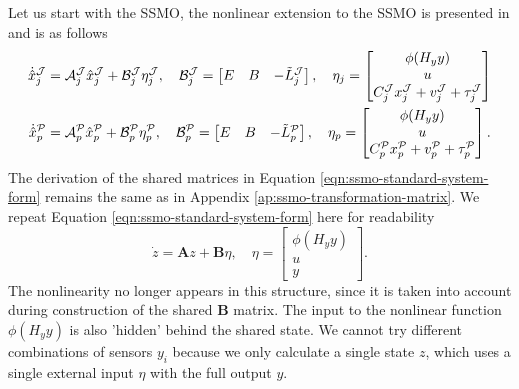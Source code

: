 Let us start with the SSMO, the nonlinear extension to the SSMO is presented in \cite{Chong2023MemoryAlgorithms} and is as follows
\begin{equation*}
    \begin{split}
        \dot{\hat{x}}_{j}^{\mathcal{J}} &= \mathcal{A}_{j}^{\mathcal{J}}\hat{x}_{j}^{\mathcal{J}} + \mathcal{B}_{j}^{\mathcal{J}}\eta_{j}^{\mathcal{J}}, \quad
        \mathcal{B}_{j}^{\mathcal{J}} =
        \begin{bmatrix}
            E & B & -\Tilde{L}_{j}^{\mathcal{J}} \\
        \end{bmatrix}, \quad \eta_j =
        \begin{bmatrix}
            \phi(H_yy) \\
            u \\
            C_{j}^{\mathcal{J}}x_{j}^{\mathcal{J}} + v_{j}^{\mathcal{J}} + \tau_{j}^{\mathcal{J}}
        \end{bmatrix} \\ 
        \dot{\hat{x}}_{p}^{\mathcal{P}} &= \mathcal{A}_{p}^{\mathcal{P}}\hat{x}_{p}^{\mathcal{P}} + \mathcal{B}_{p}^{\mathcal{P}}\eta_{p}^{\mathcal{P}}, \quad
        \mathcal{B}_{p}^{\mathcal{P}} =
        \begin{bmatrix}
            E & B & -\Tilde{L}_{p}^{\mathcal{P}} \\
        \end{bmatrix}, \quad \eta_p =
        \begin{bmatrix}
            \phi(H_yy) \\
            u \\
            C_{p}^{\mathcal{P}}x_{p}^{\mathcal{P}} + v_{p}^{\mathcal{P}} + \tau_{p}^{\mathcal{P}}
        \end{bmatrix}.
    \end{split}
\end{equation*}
The derivation of the shared matrices in Equation \eqref{eqn:ssmo-standard-system-form} remains the same as in Appendix \ref{ap:ssmo-transformation-matrix}. We repeat Equation \eqref{eqn:ssmo-standard-system-form} here for readability
\begin{equation*}
    \dot{z} = \mathbf{A}z + \mathbf{B}\eta, \quad \eta = 
    \begin{bmatrix}
        \phi(H_yy) \\ u \\ y
    \end{bmatrix}.
\end{equation*}
The nonlinearity no longer appears in this structure, since it is taken into account during construction of the shared $\mathbf{B}$ matrix. The input to the nonlinear function $\phi(H_yy)$ is also 'hidden' behind the shared state. We cannot try different combinations of sensors $y_i$ because we only calculate a single state $z$, which uses a single external input $\eta$ with the full output $y$.

